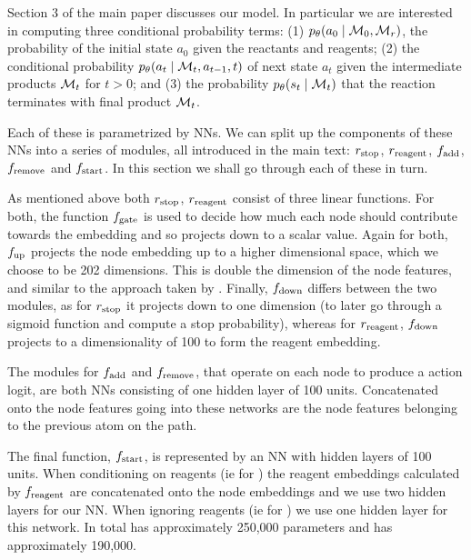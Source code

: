 Section 3 of the main paper discusses our model.
In particular we are interested in computing three conditional probability terms: (1) $p_\theta(a_0 \mid {\mathcal{M}}_0, {\mathcal{M}}_r)$, the probability of the initial state $a_0$ given the reactants and reagents; 
(2) the conditional probability $p_\theta(a_t \mid {\mathcal{M}}_t, a_{t-1}, t)$  
of next state $a_t$ given the intermediate products ${\mathcal{M}}_t$ for $t > 0$;
and (3) the probability $p_\theta(s_t \mid {\mathcal{M}}_t)$ that the reaction terminates with final product ${\mathcal{M}}_{t}$.

Each of these is parametrized by NNs. We can split up the components of these NNs into a series of modules, all introduced in the main text: $r_{\textrm{stop}}$, $r_\mathrm{reagent}$, $f_{\textrm{add}}$, $f_{\textrm{remove}}$ and $f_{\textrm{start}}$.
 In this section we shall go through each of these in turn.




As mentioned above  both $r_{\textrm{stop}}$, $r_\mathrm{reagent}$ consist of three
linear functions. 
For  both, the function $f_\textrm{gate}$ is used to decide how much each node should contribute towards the embedding and so projects down to a scalar value.
Again for both, $f_\textrm{up}$ projects the node embedding up to a higher dimensional space, which we choose to be 202 dimensions. 
This is double the dimension of the node features, and similar to the approach taken by \citet[\S B.1]{li2018learning}.
Finally, $f_\textrm{down}$ differs between the two modules, as for $r_{\textrm{stop}}$ it projects down to one dimension (to later go through a sigmoid function and compute a stop probability), whereas for  $r_\mathrm{reagent}$, $f_\textrm{down}$ projects  to a dimensionality of 100 to form the reagent embedding.


The modules for $f_{\textrm{add}}$ and $f_{\textrm{remove}}$, that operate on each node to produce a action logit, are both NNs consisting of one hidden layer of 100 units. 
Concatenated onto the node features going into these networks are the node features belonging to the previous atom on the path.



The final function, $f_{\textrm{start}}$, is represented by an NN with hidden layers of 100 units. 
When conditioning on reagents (ie for
 \ourModelR
 )
  the reagent embeddings calculated by $f_{\textrm{reagent}}$ are concatenated onto the node embeddings and we use two hidden layers for our NN. When ignoring reagents (ie for \ourModelIR) we use one hidden layer for this network. In total \ourModelR has approximately 250,000 parameters and \ourModelIR has approximately 190,000.

